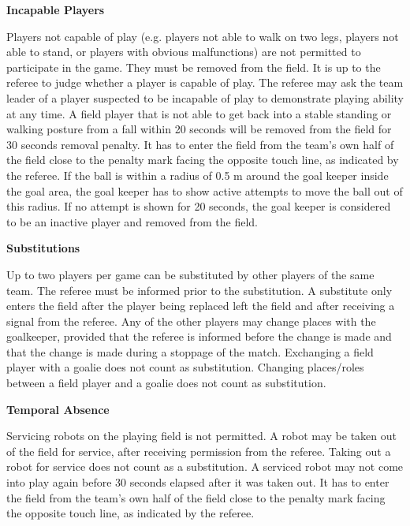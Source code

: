 \bigskip

{\bfseries Incapable Players}

Players not capable of play (e.g. players not able to walk on two legs, players not able to stand, or players with obvious malfunctions) are not permitted to participate in the game. They must be removed from the field. It is up to the referee to judge whether a player is capable of play. The referee may ask the team leader of a player suspected to be incapable of play to demonstrate playing ability at any time. A field player that is not able to get back into a stable standing or walking posture from a fall within 20 seconds will be removed from the field for 30 seconds removal penalty. It has to enter the field from the team's own half of the field close to the penalty mark facing the opposite touch line, as indicated by the referee. If the ball is within a radius of 0.5 m around the goal keeper inside the goal area, the goal keeper has to show active attempts to move the ball out of this radius. If no attempt is shown for 20 seconds, the goal keeper is considered to be an inactive player and removed from the field.

\bigskip

{\bfseries Substitutions}

Up to two players per game can be substituted by other players of the same team. The referee must be informed prior to the substitution. A substitute only enters the field after the player being replaced left the field and after receiving a signal from the referee. Any of the
other players may change places with the goalkeeper, provided that the referee is informed before the change is made and that the change is made during a stoppage of the match. Exchanging a field player with a goalie does not count as substitution. Changing places/roles between a
field player and a goalie does not count as substitution.

\bigskip

{\bfseries Temporal Absence}

Servicing robots on the playing field is not permitted. A robot may be taken out of the field for service, after receiving permission from the referee. Taking out a robot for service does not count as a substitution. A serviced robot may not come into play again before 30 seconds elapsed after it was taken out. It has to enter the field from the team's own half of the field close to the penalty mark facing the opposite touch line, as indicated by the referee.

\bigskip

